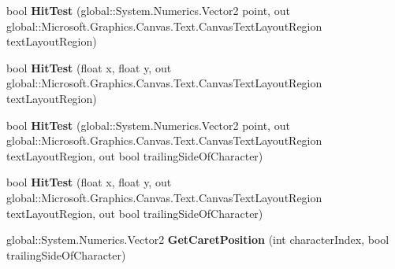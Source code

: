 \begin{DoxyCompactItemize}
\item 
\mbox{\label{class_microsoft_1_1_graphics_1_1_canvas_1_1_text_1_1_canvas_text_layout_acf6969a305076eb5ecd8ad98552ed8a5}} 
bool {\bfseries Hit\+Test} (global\+::\+System.\+Numerics.\+Vector2 point, out global\+::\+Microsoft.\+Graphics.\+Canvas.\+Text.\+Canvas\+Text\+Layout\+Region text\+Layout\+Region)
\item 
\mbox{\label{class_microsoft_1_1_graphics_1_1_canvas_1_1_text_1_1_canvas_text_layout_a39dc3babff6a75fb4e1468efdcf2ad6e}} 
bool {\bfseries Hit\+Test} (float x, float y, out global\+::\+Microsoft.\+Graphics.\+Canvas.\+Text.\+Canvas\+Text\+Layout\+Region text\+Layout\+Region)
\item 
\mbox{\label{class_microsoft_1_1_graphics_1_1_canvas_1_1_text_1_1_canvas_text_layout_a532b1b13e054c3c5b5547158050e3b94}} 
bool {\bfseries Hit\+Test} (global\+::\+System.\+Numerics.\+Vector2 point, out global\+::\+Microsoft.\+Graphics.\+Canvas.\+Text.\+Canvas\+Text\+Layout\+Region text\+Layout\+Region, out bool trailing\+Side\+Of\+Character)
\item 
\mbox{\label{class_microsoft_1_1_graphics_1_1_canvas_1_1_text_1_1_canvas_text_layout_a2bf7d833ba8cf12cacb9b8c441309e4e}} 
bool {\bfseries Hit\+Test} (float x, float y, out global\+::\+Microsoft.\+Graphics.\+Canvas.\+Text.\+Canvas\+Text\+Layout\+Region text\+Layout\+Region, out bool trailing\+Side\+Of\+Character)
\item 
\mbox{\label{class_microsoft_1_1_graphics_1_1_canvas_1_1_text_1_1_canvas_text_layout_ad61d630b4143924a996579c3c14e39bd}} 
global\+::\+System.\+Numerics.\+Vector2 {\bfseries Get\+Caret\+Position} (int character\+Index, bool trailing\+Side\+Of\+Character)
\item 
\mbox{\label{class_microsoft_1_1_graphics_1_1_canvas_1_1_text_1_1_canvas_text_layout_a570264c3b7269effae081d1e5a88df05}} 

\end{DoxyCompactItemize}
